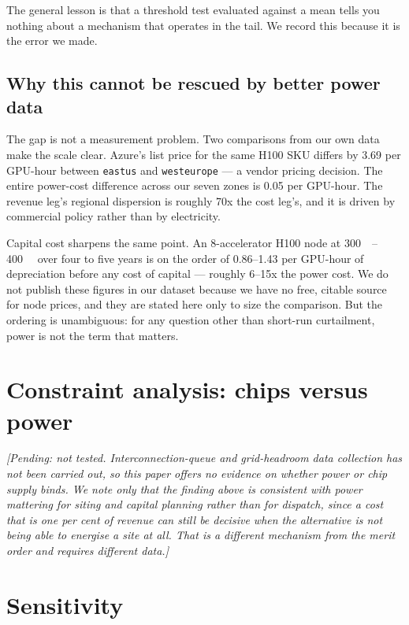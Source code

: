 \documentclass[11pt]{article}
\newcommand{\todopending}[1]{{\color{gray!70!black}\itshape[Pending: #1]}}
\begin{document}
The general lesson is that a threshold test evaluated against a mean tells
you nothing about a mechanism that operates in the tail. We record this
because it is the error we made.

\subsection{Why this cannot be rescued by better power data}

The gap is not a measurement problem. Two comparisons from our own data
make the scale clear. Azure's list price for the same H100 SKU differs by
\SI{3.69}{\usd} per GPU-hour between \texttt{eastus} and
\texttt{westeurope} --- a vendor pricing decision. The entire power-cost
difference across our seven zones is \SI{0.05}{\usd} per GPU-hour. The
revenue leg's regional dispersion is roughly \num{70}x the cost leg's, and
it is driven by commercial policy rather than by electricity.

Capital cost sharpens the same point. An 8-accelerator H100 node at
\SIrange{300}{400}{\kilo\usd} over four to five years is on the order of
\SIrange{0.86}{1.43}{\usd} per GPU-hour of depreciation before any cost of
capital --- roughly \numrange{6}{15}x the power cost. We do not publish
these figures in our dataset because we have no free, citable source for
node prices, and they are stated here only to size the comparison. But the
ordering is unambiguous: for any question other than short-run curtailment,
power is not the term that matters.

\section{Constraint analysis: chips versus power}
\label{sec:constraints}

\todopending{not tested. Interconnection-queue and grid-headroom data
collection has not been carried out, so this paper offers no evidence on
whether power or chip supply binds. We note only that the finding above is
consistent with power mattering for \emph{siting and capital planning}
rather than for dispatch, since a cost that is one per cent of revenue can
still be decisive when the alternative is not being able to energise a
site at all. That is a different mechanism from the merit order and
requires different data.}

\section{Sensitivity}
\label{sec:sensitivity}
\end{document}

